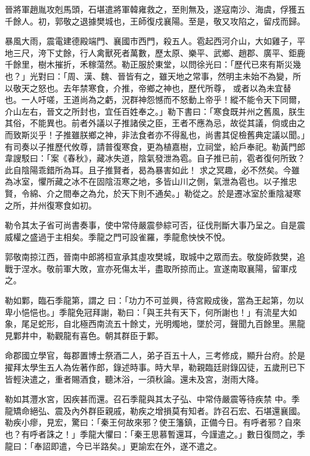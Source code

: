 \begin{pinyinscope}
 晉將軍趙胤攻剋馬頭，石堪遣將軍韓雍救之，至則無及，遂寇南沙、海虞，俘獲五千餘人。初，郭敬之退據樊城也，王師復戍襄陽。至是，敬又攻陷之，留戍而歸。



 暴風大雨，震電建德殿端門、襄國市西門，殺五人。雹起西河介山，大如雞子，平地三尺，洿下丈餘，行人禽獸死者萬數，歷太原、樂平、武鄉、趙郡、廣平、鉅鹿千餘里，樹木摧折，禾稼蕩然。勒正服於東堂，以問徐光曰：「歷代已來有斯災幾也？」光對曰：「周、漢、魏、晉皆有之，雖天地之常事，然明主未始不為變，所以敬天之怒也。去年禁寒食，介推，帝鄉之神也，歷代所尊，
 或者以為未宜替也。一人吁嗟，王道尚為之虧，況群神怨憾而不怒動上帝乎！縱不能令天下同爾，介山左右，晉文之所封也，宜任百姓奉之。」勒下書曰：「寒食既并州之舊風，朕生其俗，不能異也。前者外議以子推諸侯之臣，王者不應為忌，故從其議，倘或由之而致斯災乎！子推雖朕鄉之神，非法食者亦不得亂也，尚書其促檢舊典定議以聞。」有司奏以子推歷代攸尊，請普復寒食，更為植嘉樹，立祠堂，給戶奉祀。勒黃門郎韋謏駁曰：「案《春秋》，藏冰失道，陰氣發泄為雹。自子推已前，雹者復何所致？此自陰陽乖錯所為耳。且子推賢者，曷為暴害如此！
 求之冥趣，必不然矣。今雖為冰室，懼所藏之冰不在固陰沍寒之地，多皆山川之側，氣泄為雹也。以子推忠賢，令綿、介之間奉之為允，於天下則不通矣。」勒從之。於是遷冰室於重陰凝寒之所，并州復寒食如初。



 勒令其太子省可尚書奏事，使中常侍嚴震參綜可否，征伐刑斷大事乃呈之。自是震威權之盛過于主相矣。季龍之門可設雀羅，季龍愈怏怏不悅。



 郭敬南掠江西，晉南中郎將桓宣承其虛攻樊城，取城中之眾而去。敬旋師救樊，追戰于涅水。敬前軍大敗，宣亦死傷太半，盡取所掠而止。宣遂南取襄陽，留軍戍之。



 勒如鄴，臨石季龍第，謂之
 曰：「功力不可並興，待宮殿成後，當為王起第，勿以卑小悒悒也。」季龍免冠拜謝，勒曰：「與王共有天下，何所謝也！」有流星大如象，尾足蛇形，自北極西南流五十餘丈，光明燭地，墜於河，聲聞九百餘里。黑龍見鄴井中，勒觀龍有喜色。朝其群臣于鄴。



 命郡國立學官，每郡置博士祭酒二人，弟子百五十人，三考修成，顯升台府。於是擢拜太學生五人為佐著作郎，錄述時事。時大旱，勒親臨廷尉錄囚徒，五歲刑已下皆輕決遣之，重者賜酒食，聽沐浴，一須秋論。還未及宮，澍雨大降。



 勒如其灃水宮，因疾甚而還。召石季龍與其太子弘、中常侍嚴震等待疾禁
 中。季龍矯命絕弘、震及內外群臣親戚，勒疾之增損莫有知者。詐召石宏、石堪還襄國。勒疾小瘳，見宏，驚曰：「秦王何故來邪？使王籓鎮，正備今日。有呼者邪？自來也？有呼者誅之！」季龍大懼曰：「秦王思慕暫還耳，今謹遣之。」數日復問之，季龍曰：「奉詔即遣，今已半路矣。」更諭宏在外，遂不遣之。




\end{pinyinscope}
